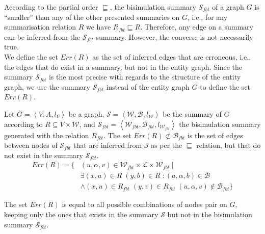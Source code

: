 According to the partial order $\sqsubseteq$, the bisimulation summary $\mathcal{S}_{fbt}$ of a graph $G$ is ``smaller'' than any of the other presented summaries on $G$, i.e., for any summarisation relation $R$ we have $R_{fbt} \sqsubseteq R$. Therefore, any edge on a summary can be inferred from the $\mathcal{S}_{fbt}$ summary. However, the converse is not necessarily true.\\

We define the set $Err(R)$ as the set of inferred edges that are erroneous, i.e., the edges that do exist in a summary, but not in the entity graph. Since the summary $\mathcal{S}_{fbt}$ is the most precise with regards to the structure of the entity graph, we use the summary $\mathcal{S}_{fbt}$ instead of the entity graph $G$ to define the set $Err(R)$.

\begin{definition}
Let $G=\left\langle V, A, l_V \right\rangle$ be a graph, $\mathcal{S} = \left\langle \mathcal{W}, \mathcal{B}, l_{\mathcal{W}} \right\rangle$ be the summary of $G$ according to $R \subseteq V \times \mathcal{W}$, and $\mathcal{S}_{fbt} = \left\langle \mathcal{W}_{fbt}, \mathcal{B}_{fbt}, l_{\mathcal{W}_{fbt}} \right\rangle$ the bisimulation summary generated with the relation $R_{fbt}$.
The set $Err(R) \not \subset \mathcal{B}_{fbt}$ is the set of edges between nodes of $\mathcal{S}_{fbt}$ that are inferred from $\mathcal{S}$ as per the $\sqsubseteq$ relation, but that do not exist in the summary $\mathcal{S}_{fbt}$.
\begin{equation*}
\begin{split}
Err(R) = \{ & (u, \alpha, v) \in \mathcal{W}_{fbt} \times \mathcal{L} \times \mathcal{W}_{fbt} \mid \\
 & \exists (x,a) \in R\; (y,b) \in R\;: (a, \alpha, b) \in \mathcal{B} \\
 & \wedge (x, u) \in R_{fbt}\; (y, v) \in R_{fbt}\; (u, \alpha, v) \not \in \mathcal{B}_{fbt} \}
\end{split}
\end{equation*}
\end{definition}

\begin{remark}
The set $Err(R)$ is equal to all possible combinations of nodes pair on $G$, keeping only the ones that exists in the summary $\mathcal{S}$ but not in the bisimulation summary $\mathcal{S}_{fbt}$.
\end{remark}

